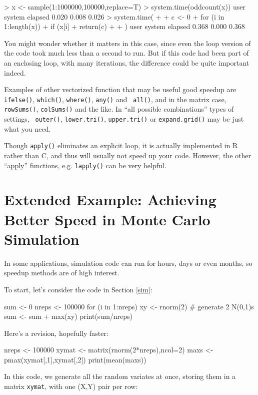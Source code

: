 \begin{Code}
> x <- sample(1:1000000,100000,replace=T)
> system.time(oddcount(x))
   user  system elapsed
  0.020   0.008   0.026
> system.time(
+    {
+    c <- 0
+    for (i in 1:length(x))
+       if (x[i] %
+    return(c)
+ }
+ )
   user  system elapsed 
  0.368   0.000   0.368 
\end{Code}

You might wonder whether it matters in this case, since even the loop
version of the code took much less than a second to run.  But if this
code had been part of an enclosing loop, with many iterations, the
difference could be quite important indeed.

Examples of other vectorized function that may be useful good speedup
are {\tt ifelse()}, {\tt which()}, {\tt where()}, {\tt any()} and {\tt
all()}, and in the matrix case, {\tt rowSums()}, {\tt colSums()} and the
like.  In ``all possible combinations'' types of settings, {\tt
outer()}, {\tt lower.tri()}, {\tt upper.tri()} or {\tt expand.grid()}
may be just what you need.

Though {\tt apply()} eliminates an explicit loop, it is actually
implemented in R rather than C, and thus will usually not speed up your
code.  However, the other ``apply'' functions, e.g. {\tt lapply()} can
be very helpful.

\section{Extended Example:  Achieving Better Speed in Monte Carlo Simulation}

In some applications, simulation code can run for hours, days or even
months, so speedup methods are of high interest.

To start, let's consider the code in Section \ref{sim}:

\begin{Code}
sum <- 0
nreps <- 100000
for (i in 1:nreps) {
   xy <- rnorm(2)  # generate 2 N(0,1)s
   sum <- sum + max(xy)
}
print(sum/nreps)
\end{Code}

\noindent
Here's a revision, hopefully faster:

\begin{Code}
nreps <- 100000
xymat <- matrix(rnorm(2*nreps),ncol=2)
maxs <- pmax(xymat[,1],xymat[,2])
print(mean(maxs))
\end{Code}

\noindent
In this code, we generate all the random variates at once, storing them
in a matrix {\tt xymat}, with one (X,Y) pair per row:

